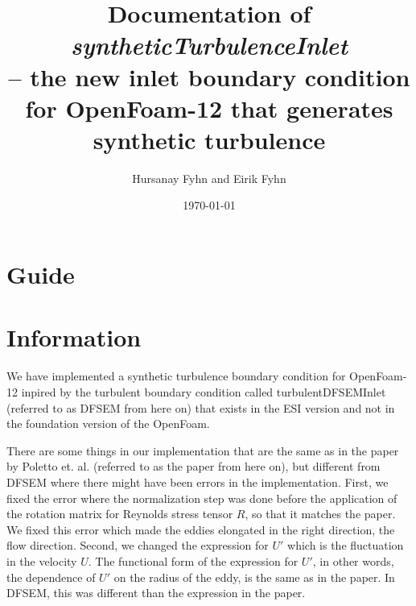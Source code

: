 \documentclass[
 amsmath,amssymb,
 aps,
]{revtex4-2}
\begin{document}
\title{Documentation of \textit{syntheticTurbulenceInlet}\\ -- the new inlet boundary condition for OpenFoam-12 that generates synthetic turbulence}
\author{Hursanay Fyhn and Eirik Fyhn}

\date{\today}


\maketitle

 \tableofcontents

\section{Guide}%
\label{sec:guide}


\section{Information}%
\label{sec:Information}
We have implemented a synthetic turbulence boundary condition for OpenFoam-12 inpired by the turbulent boundary condition called turbulentDFSEMInlet (referred to as DFSEM from here on) that exists in the ESI version and not in the foundation version of the OpenFoam.

There are some things in our implementation that are the same as in the paper by Poletto et. al. (referred to as the paper from here on), but different from DFSEM where there might have been errors in the implementation.
First, we fixed the error where the normalization step was done before the application of the rotation matrix for Reynolds stress tensor $R$, so that it matches the paper.
We fixed this error which made the eddies elongated in the right direction, the flow direction.
Second, we changed the expression for $U'$ which is the fluctuation in the velocity $U$.
The functional form of the expression for $U'$, in other words, the dependence of $U'$ on the radius of the eddy, is the same as in the paper. 
In DFSEM, this was different than the expression in the paper.
\end{document}
